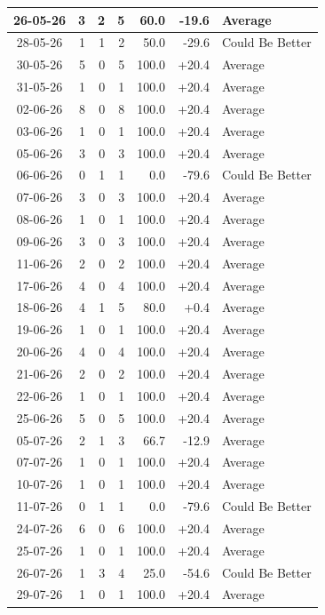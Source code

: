\documentclass[journal]{IEEEtran}
\numberwithin{equation}{subsection}
\begin{document}
\begin{longtable}{|c|r|r|r|r|r|l|}
26-05-26 & 3 & 2 & 5 & 60.0 & -19.6 & Average\\ \hline
28-05-26 & 1 & 1 & 2 & 50.0 & -29.6 & Could Be Better\\ \hline
30-05-26 & 5 & 0 & 5 & 100.0 & +20.4 & Average\\ \hline
31-05-26 & 1 & 0 & 1 & 100.0 & +20.4 & Average\\ \hline
02-06-26 & 8 & 0 & 8 & 100.0 & +20.4 & Average\\ \hline
03-06-26 & 1 & 0 & 1 & 100.0 & +20.4 & Average\\ \hline
05-06-26 & 3 & 0 & 3 & 100.0 & +20.4 & Average\\ \hline
06-06-26 & 0 & 1 & 1 & 0.0 & -79.6 & Could Be Better\\ \hline
07-06-26 & 3 & 0 & 3 & 100.0 & +20.4 & Average\\ \hline
08-06-26 & 1 & 0 & 1 & 100.0 & +20.4 & Average\\ \hline
09-06-26 & 3 & 0 & 3 & 100.0 & +20.4 & Average\\ \hline
11-06-26 & 2 & 0 & 2 & 100.0 & +20.4 & Average\\ \hline
17-06-26 & 4 & 0 & 4 & 100.0 & +20.4 & Average\\ \hline
18-06-26 & 4 & 1 & 5 & 80.0 & +0.4 & Average\\ \hline
19-06-26 & 1 & 0 & 1 & 100.0 & +20.4 & Average\\ \hline
20-06-26 & 4 & 0 & 4 & 100.0 & +20.4 & Average\\ \hline
21-06-26 & 2 & 0 & 2 & 100.0 & +20.4 & Average\\ \hline
22-06-26 & 1 & 0 & 1 & 100.0 & +20.4 & Average\\ \hline
25-06-26 & 5 & 0 & 5 & 100.0 & +20.4 & Average\\ \hline
05-07-26 & 2 & 1 & 3 & 66.7 & -12.9 & Average\\ \hline
07-07-26 & 1 & 0 & 1 & 100.0 & +20.4 & Average\\ \hline
10-07-26 & 1 & 0 & 1 & 100.0 & +20.4 & Average\\ \hline
11-07-26 & 0 & 1 & 1 & 0.0 & -79.6 & Could Be Better\\ \hline
24-07-26 & 6 & 0 & 6 & 100.0 & +20.4 & Average\\ \hline
25-07-26 & 1 & 0 & 1 & 100.0 & +20.4 & Average\\ \hline
26-07-26 & 1 & 3 & 4 & 25.0 & -54.6 & Could Be Better\\ \hline
29-07-26 & 1 & 0 & 1 & 100.0 & +20.4 & Average\\ \hline

\end{longtable}
\end{document}
